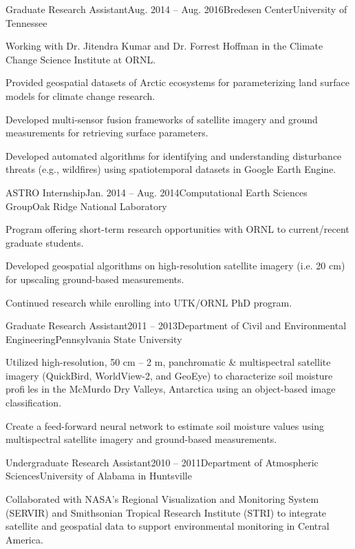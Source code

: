 \documentclass{tidycv} %
\begin{document}
\begin{cvresearches}

\begin{cvresearch}{Graduate Research Assistant}{Aug. 2014 -- Aug. 2016}{Bredesen Center}{University of Tennessee}
 \item Working with Dr. Jitendra Kumar and Dr. Forrest Hoffman in the Climate Change Science Institute at ORNL.
 \item Provided geospatial datasets of Arctic ecosystems for parameterizing land surface models for climate change research.
 \item  Developed multi-sensor fusion frameworks of satellite imagery and ground measurements for retrieving surface parameters.
 \item  Developed automated algorithms for identifying and understanding disturbance threats
(e.g., wildfires) using spatiotemporal datasets in Google Earth Engine.
\end{cvresearch}

\begin{cvresearch}{ASTRO Internship}{Jan. 2014 -- Aug. 2014}{Computational Earth Sciences Group}{Oak Ridge National Laboratory}
 \item Program offering short-term research opportunities with ORNL to current/recent graduate students. 
 \item Developed geospatial algorithms on high-resolution satellite imagery (i.e. 20 cm) for upscaling ground-based measurements.
 \item Continued research while enrolling into UTK/ORNL PhD program.
\end{cvresearch}

\begin{cvresearch}{Graduate Research Assistant}{2011 -- 2013}{Department of Civil and Environmental Engineering}{Pennsylvania State University}
 \item Utilized high-resolution, 50 cm -- 2 m, panchromatic \& multispectral satellite imagery
(QuickBird, WorldView-2, and GeoEye) to characterize soil moisture profiles in the McMurdo Dry Valleys, Antarctica using an object-based image classification. 
 \item Create a feed-forward neural network to estimate soil moisture values using multispectral satellite imagery and ground-based measurements.
\end{cvresearch}

\begin{cvresearch}{Undergraduate Research Assistant}{2010 -- 2011}{Department of Atmospheric Sciences}{University of Alabama in Huntsville}
\item Collaborated with NASA's Regional Visualization and Monitoring System (SERVIR) and
Smithsonian Tropical Research Institute (STRI) to integrate satellite and geospatial data
to support environmental monitoring in Central America.
\end{cvresearch}

\end{cvresearches}
\end{document}
